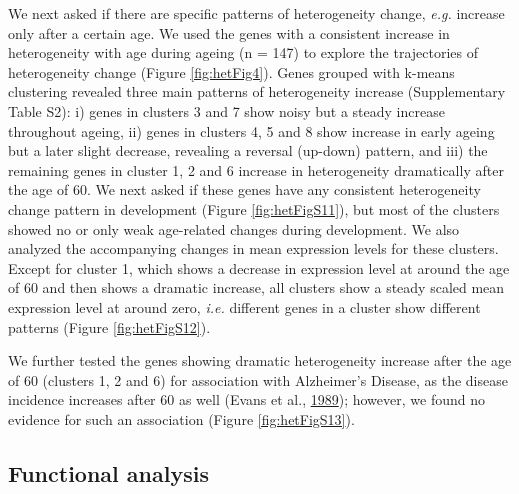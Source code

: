\documentclass[12pt,twoside]{unicam}
\begin{document}
We next asked if there are specific patterns of heterogeneity change, \emph{e.g.} increase only after a certain age. We used the genes with a consistent increase in heterogeneity with age during ageing (n = 147) to explore the trajectories of heterogeneity change (Figure \ref{fig:hetFig4}). Genes grouped with k-means clustering revealed three main patterns of heterogeneity increase (Supplementary Table S2): i) genes in clusters 3 and 7 show noisy but a steady increase throughout ageing, ii) genes in clusters 4, 5 and 8 show increase in early ageing but a later slight decrease, revealing a reversal (up-down) pattern, and iii) the remaining genes in cluster 1, 2 and 6 increase in heterogeneity dramatically after the age of 60. We next asked if these genes have any consistent heterogeneity change pattern in development (Figure \ref{fig:hetFigS11}), but most of the clusters showed no or only weak age-related changes during development. We also analyzed the accompanying changes in mean expression levels for these clusters. Except for cluster 1, which shows a decrease in expression level at around the age of 60 and then shows a dramatic increase, all clusters show a steady scaled mean expression level at around zero, \emph{i.e.} different genes in a cluster show different patterns (Figure \ref{fig:hetFigS12}).

We further tested the genes showing dramatic heterogeneity increase after the age of 60 (clusters 1, 2 and 6) for association with Alzheimer's Disease, as the disease incidence increases after 60 as well (Evans et al., \protect\hyperlink{ref-Evans1989}{1989}); however, we found no evidence for such an association (Figure \ref{fig:hetFigS13}).

\hypertarget{functional-analysis}{%
\subsection{Functional analysis}\label{functional-analysis}}
\end{document}

